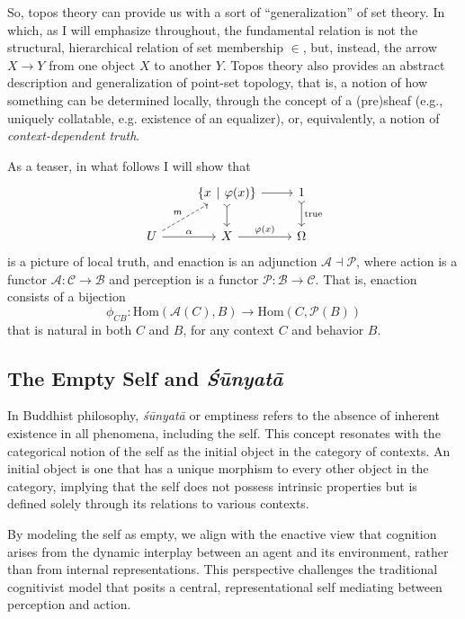 \documentclass{article}
\begin{document}
So, topos theory can provide us with a sort of ``generalization'' of set theory. In which, as I will emphasize throughout, the fundamental relation is not the structural, hierarchical relation of set membership $\in$, but, instead, the arrow $X \to Y$ from one object $X$ to another $Y.$ Topos theory also provides an abstract description and generalization of point-set topology, that is, a notion of how something can be determined locally, through the concept of a (pre)sheaf (e.g., uniquely collatable, e.g. existence of an equalizer), or, equivalently, a notion of \emph{context-dependent truth}.

As a teaser, in what follows I will show that  
\[
\begin{tikzcd}
& \{ x \hspace{4px} | \hspace{4px} \varphi(x) \}  \arrow[r] \arrow[d, tail] & 1 \arrow[d, tail, "\text{true}"] \\
U \arrow[r, "\alpha"] \arrow[ru, dashed, "m"] & X \arrow[r, "\varphi(x)"] & \Omega
\end{tikzcd}
\]
is a picture of local truth, and enaction is an adjunction $\mathcal{A} \dashv \mathcal{P}$, where action is a functor $\mathcal{A} \colon \mathcal{C} \to \mathcal{B}$ and perception is a functor $\mathcal{P} \colon \mathcal{B} \to \mathcal{C}$. That is, enaction consists of a bijection 
\[
\phi_{CB} \colon \text{Hom} ( \mathcal{A}(C), B ) \to \text{Hom}(C, \mathcal{P}(B))
\]
that is natural in both $C$ and $B$, for any context $C$ and behavior $B$.

\subsection{The Empty Self and \emph{Śūnyatā}} \label{sec:self}

In Buddhist philosophy, \emph{śūnyatā} or emptiness refers to the absence of inherent existence in all phenomena, including the self. This concept resonates with the categorical notion of the self as the initial object in the category of contexts. An initial object is one that has a unique morphism to every other object in the category, implying that the self does not possess intrinsic properties but is defined solely through its relations to various contexts.

By modeling the self as empty, we align with the enactive view that cognition arises from the dynamic interplay between an agent and its environment, rather than from internal representations. This perspective challenges the traditional cognitivist model that posits a central, representational self mediating between perception and action.
\end{document}
